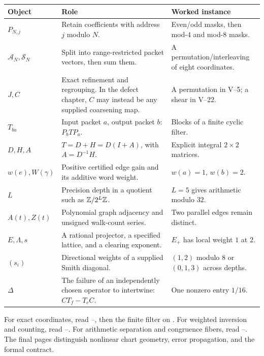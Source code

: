 {\small
\begin{tabularx}{\linewidth}{@{}p{.15\linewidth}Yp{.28\linewidth}@{}}\toprule
\textbf{Object} & \textbf{Role} & \textbf{Worked instance}\\\midrule
$P_{N,j}$ & Retain coefficients with address $j$ modulo $N$. & Even/odd masks, then mod-$4$ and mod-$8$ masks.\\
$\mathcal A_N,\mathcal S_N$ & Split into range-restricted packet vectors, then sum them. & A permutation/interleaving of eight coordinates.\\
$J,C$ & Exact refinement and regrouping. In the defect chapter, $C$ may instead be any supplied coarsening map. & A permutation in V--5; a shear in V--22.\\
$T_{ba}$ & Input packet $a$, output packet $b$: $P_bTP_a$. & Blocks of a finite cyclic filter.\\
$D,H,A$ & $T=D+H=D(I+A)$, with $A=D^{-1}H$. & Explicit integral $2\times2$ matrices.\\
$w(e),W(\gamma)$ & Positive certified edge gain and its additive word weight. & $w(a)=1$, $w(b)=2$.\\
$L$ & Precision depth in a quotient such as $\mathbb Z/2^L\mathbb Z$. & $L=5$ gives arithmetic modulo $32$.\\
$A(t),Z(t)$ & Polynomial graph adjacency and unsigned walk-count series. & Two parallel edges remain distinct.\\
$E,\Lambda,s$ & A rational projector, a specified lattice, and a clearing exponent. & $E_+$ has local weight $1$ at $2$.\\
$(s_i)$ & Directional weights of a supplied Smith diagonal. & $(1,2)$ modulo $8$ or $(0,1,3)$ across depths.\\
$\Delta$ & The failure of an independently chosen operator to intertwine: $CT_f-T_cC$. & One nonzero entry $1/16$.\\\bottomrule
\end{tabularx}}

For exact coordinates, read --, then the finite filter on . For weighted inversion and counting, read --. For arithmetic separation and congruence fibers, read --. The final pages distinguish nonlinear chart geometry, error propagation, and the formal contract.


